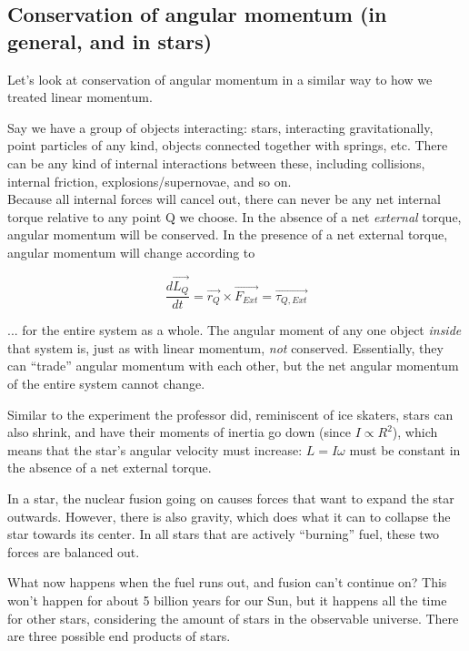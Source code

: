 \subsection{Conservation of angular momentum (in general, and in stars)}

Let's look at conservation of angular momentum in a similar way to how we treated linear momentum.

Say we have a group of objects interacting: stars, interacting gravitationally, point particles of any kind, objects connected together with springs, etc. There can be any kind of internal interactions between these, including collisions, internal friction, explosions/supernovae, and so on.\\
Because all internal forces will cancel out, there can never be any net internal torque relative to any point Q we choose. In the absence of a net \emph{external} torque, angular momentum will be conserved. In the presence of a net external torque, angular momentum will change according to

\begin{equation}
\frac{d\vec{L_Q}}{dt} = \vec{r_Q} \times \vec{F_{Ext}} = \vec{\tau_{Q,Ext}}
\end{equation}

... for the entire system as a whole. The angular moment of any one object \emph{inside} that system is, just as with linear momentum, \emph{not} conserved. Essentially, they can ``trade'' angular momentum with each other, but the net angular momentum of the entire system cannot change.

Similar to the experiment the professor did, reminiscent of ice skaters, stars can also shrink, and have their moments of inertia go down (since $I \propto R^2$), which means that the star's angular velocity must increase: $L = I \omega$ must be constant in the absence of a net external torque.

In a star, 	the nuclear fusion going on causes forces that want to expand the star outwards. However, there is also gravity, which does what it can to collapse the star towards its center. In all stars that are actively ``burning'' fuel, these two forces are balanced out.

What now happens when the fuel runs out, and fusion can't continue on? This won't happen for about 5 billion years for our Sun, but it happens all the time for other stars, considering the amount of stars in the observable universe. There are three possible end products of stars.

